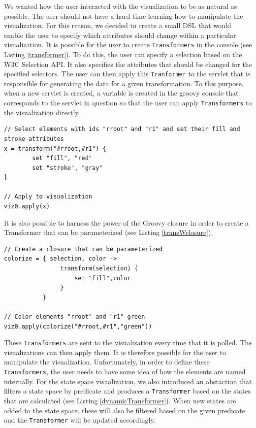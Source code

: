 We wanted how the user interacted with the visualization to be as natural as possible. The user should not have a hard time learning how to manipulate the visualization. For this reason, we decided to create a small DSL that would enable the user to specify which attributes should change within a particular visualization. It is possible for the user to create \texttt{Transformers} in the console (see Listing \ref{transformer}). To do this, the user can specify a selection based on the W3C Selection API. It also specifies the attributes that should be changed for the specified selectors. The user can then apply this \texttt{Tranformer} to the servlet that is responsible for generating the data for a given transformation. To this purpose, when a new servlet is created, a variable is created in the groovy console that corresponds to the servlet in question so that the user can apply \texttt{Transformers} to the visualization directly.

\lstset{language=java}
\begin{lstlisting}[caption=Define rules for the transformation of visualization elements,label=transformer]
// Select elements with ids "rroot" and "r1" and set their fill and stroke attributes
x = transform("#rroot,#r1") {
        set "fill", "red"
        set "stroke", "gray"
}

// Apply to visualization
viz0.apply(x)
\end{lstlisting}

It is also possible to harness the power of the Groovy closure in order to create a Transformer that can be parameterized (see Listing \ref{transWclosure}).

\begin{lstlisting}[caption=Use Groovy closures to generate Transformers,label=transWclosure]
// Create a closure that can be parameterized
colorize = { selection, color ->
                transform(selection) {
                    set "fill",color
                }    
           }

// Color elements "rroot" and "r1" green
viz0.apply(colorize("#rroot,#r1","green"))
\end{lstlisting}

These \texttt{Transformers} are sent to the visualization every time that it is polled. The visualizations can then apply them. It is therefore possible for the user to manipulate the visualization. Unfortunately, in order to define these \texttt{Transformers}, the user needs to have some idea of how the elements are named internally. For the state space visualization, we also introduced an abstaction that filters a state space by predicate and produces a \texttt{Transformer} based on the states that are calculated (see Listing \ref{dynamicTransformer}). When new states are added to the state space, these will also be filtered based on the given predicate and the \texttt{Transformer} will be updated accordingly. 

